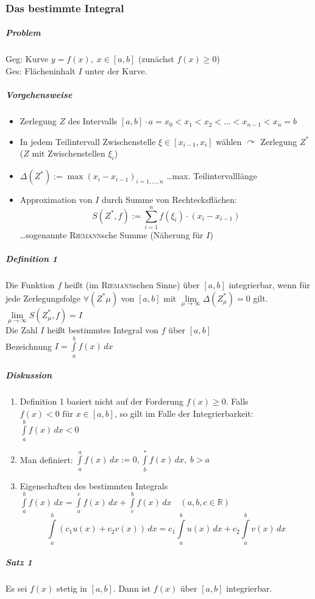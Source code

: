 \documentclass[a4paper]{scrartcl}
\begin{document}
\subsubsection{Das bestimmte Integral}
\subparagraph{Problem} Geg: Kurve $y=f(x), \; x \in [a,b]$ (zunächst $f(x) \geq 0$)\\
Ges: Flächeninhalt $I$ unter der Kurve.
\subparagraph{Vorgehensweise}
\begin{itemize}
\item Zerlegung $Z$ des Intervalls $[a,b] \cdot a = x_0 < x_1 < x_2 < \dots < x_{n-1} < x_n = b$
\item In jedem Teilintervall Zwischenstelle $\xi \in [x_{i-1}, x_i]$ wählen $\curvearrowright$ Zerlegung $Z^*$ ($Z$ mit Zwischenstellen $\xi_i$)
\item $\Delta (Z^*) := \max{(x_i - x_{i-1} )}_{i = 1,\dots,n} $ \dots max. Teilintervalllänge
\item Approximation von $I$ durch Summe von Rechtecksflächen:
\[ S(Z^*,f) := \sum\limits_{i=1}^{n} f(\xi_i) \cdot (x_i - x_{i-1} )\]
\dots sogenannte \textsc{Riemann}sche Summe (Näherung für $I$)
\end{itemize}
\subparagraph{Definition 1} Die Funktion $f$ heißt (im \textsc{Riemann}schen Sinne) über $[a,b]$ integrierbar, wenn für jede Zerlegungsfolge $ \forall (Z^*\mu)$ von $[a,b]$ mit $\lim\limits_{\mu \to \infty} \Delta (Z_\mu^*) = 0$ gilt. $\lim\limits_{\mu \to \infty} S(Z_\mu^*,f) = I$\\
Die Zahl $I$ heißt bestimmtes Integral von $f$ über $[a,b]$\\
Bezeichnung $I = \int\limits_{a}^{b} f(x) \,dx$

\subparagraph{Diskussion}
\begin{enumerate}
\item Definition 1 basiert nicht auf der Forderung $f(x) \geq 0$. Falls $f(x) < 0 \text{ für } x \in [a,b]$, so gilt im Falle der Integrierbarkeit: $\int\limits_{a}^{b} f(x) \, dx <0$ 
\item Man definiert: $\int\limits_{a}^{a} f(x) \, dx := 0, \int\limits_b^* f(x) \, dx, \; b > a$
\item Eigenschaften des bestimmten Integrals
$\int\limits_a^b f(x) \, dx =  \int\limits_a^c f(x) \, dx  + \int\limits_c^b f(x) \, dx \quad (a,b,c \in \mathbb{R} ) $
\[ \int\limits_a^b (c_1 u(x) + c_2 v(x)) \, dx = c_1 \int\limits_a^b u(x) \, dx + c_2 \int\limits_a^b v(x) \, dx \]
\end{enumerate}

\subparagraph{Satz 1} Es sei $f(x)$ stetig in $[a,b]$. Dann ist $f(x)$ über $[a,b]$ integrierbar.
\end{document}
